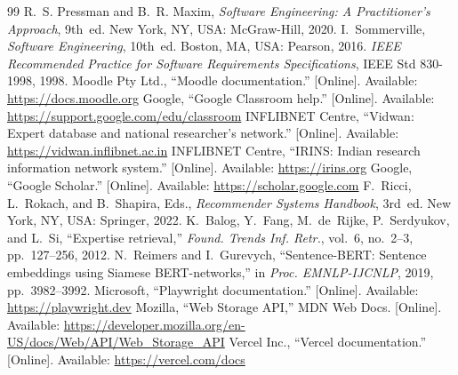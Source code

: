\documentclass[conference]{IEEEtran}
\begin{document}
\begin{thebibliography}{99}
 R.~S. Pressman and B.~R. Maxim, \emph{Software Engineering: A Practitioner's Approach}, 9th~ed. New York, NY, USA: McGraw-Hill, 2020.
 I.~Sommerville, \emph{Software Engineering}, 10th~ed. Boston, MA, USA: Pearson, 2016.
 \emph{IEEE Recommended Practice for Software Requirements Specifications}, IEEE Std 830-1998, 1998.
 Moodle Pty Ltd., ``Moodle documentation.'' [Online]. Available: \url{https://docs.moodle.org}
 Google, ``Google Classroom help.'' [Online]. Available: \url{https://support.google.com/edu/classroom}
 INFLIBNET Centre, ``Vidwan: Expert database and national researcher's network.'' [Online]. Available: \url{https://vidwan.inflibnet.ac.in}
 INFLIBNET Centre, ``IRINS: Indian research information network system.'' [Online]. Available: \url{https://irins.org}
 Google, ``Google Scholar.'' [Online]. Available: \url{https://scholar.google.com}
 F.~Ricci, L.~Rokach, and B.~Shapira, Eds., \emph{Recommender Systems Handbook}, 3rd~ed. New York, NY, USA: Springer, 2022.
 K.~Balog, Y.~Fang, M.~de~Rijke, P.~Serdyukov, and L.~Si, ``Expertise retrieval,'' \emph{Found. Trends Inf. Retr.}, vol.~6, no.~2--3, pp.~127--256, 2012.
 N.~Reimers and I.~Gurevych, ``Sentence-BERT: Sentence embeddings using Siamese BERT-networks,'' in \emph{Proc. EMNLP-IJCNLP}, 2019, pp.~3982--3992.
 Microsoft, ``Playwright documentation.'' [Online]. Available: \url{https://playwright.dev}
 Mozilla, ``Web Storage API,'' MDN Web Docs. [Online]. Available: \url{https://developer.mozilla.org/en-US/docs/Web/API/Web_Storage_API}
 Vercel Inc., ``Vercel documentation.'' [Online]. Available: \url{https://vercel.com/docs}
\end{thebibliography}
\end{document}
